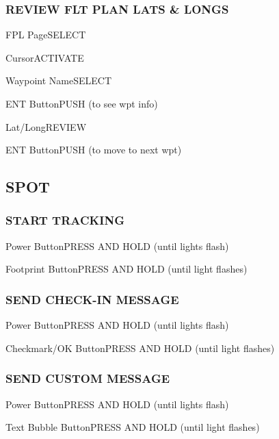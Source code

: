 \begin{multicols}{2}
\subsubsection*{REVIEW FLT PLAN LATS \& LONGS}
\begin{enumerate*}
\item FPL Page\dotfill SELECT
\item Cursor\dotfill ACTIVATE
\item Waypoint Name\dotfill SELECT
\item ENT Button\dotfill PUSH (to see wpt info)
\item Lat/Long\dotfill REVIEW
\item ENT Button\dotfill PUSH (to move to next wpt)
\end{enumerate*}

\subsection*{SPOT}
\subsubsection*{START TRACKING}
\begin{enumerate*}
\item Power Button\dotfill PRESS AND HOLD (until lights flash)
\item Footprint Button\dotfill PRESS AND HOLD (until light flashes)
\end{enumerate*}

\subsubsection*{SEND CHECK-IN MESSAGE}
\begin{enumerate*}
\item Power Button\dotfill PRESS AND HOLD (until lights flash)
\item Checkmark/OK Button\dotfill PRESS AND HOLD (until light flashes)
\end{enumerate*}

\subsubsection*{SEND CUSTOM MESSAGE}
\begin{enumerate*}
\item Power Button\dotfill PRESS AND HOLD (until lights flash)
\item Text Bubble Button\dotfill PRESS AND HOLD (until light flashes)
\end{enumerate*}


\end{multicols}
